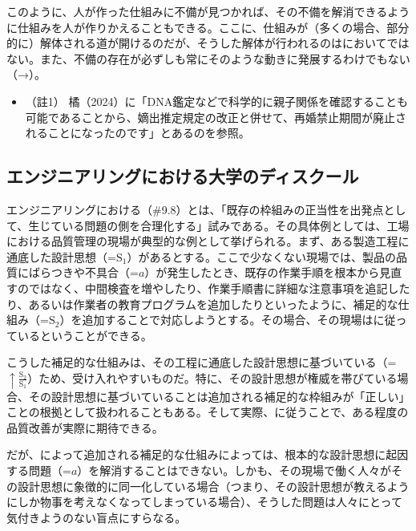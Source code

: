 このように、人が作った仕組みに不備が見つかれば、その不備を解消できるように仕組みを人が作りかえることもできる。ここに、仕組みが（多くの場合、部分的に）解体される道が開けるのだが、そうした解体が行われるのはにおいてではない。また、不備の存在が必ずしも常にそのような動きに発展するわけでもない（→）。

\begin{itemize}
\tightlist
\item
  （註1）
  橘（2024）\cite{Tachibana}に「DNA鑑定などで科学的に親子関係を確認することも可能であることから、嫡出推定規定の改正と併せて、再婚禁止期間が廃止されることになったのです」とあるのを参照。
\end{itemize}

\subsection{エンジニアリングにおける大学のディスクール}\label{ux30a8ux30f3ux30b8ux30cbux30a2ux30eaux30f3ux30b0ux306bux304aux3051ux308bux5927ux5b66ux306eux30c7ux30a3ux30b9ux30afux30fcux30eb}

エンジニアリングにおける（\#9.8）とは、「既存の枠組みの正当性を出発点として、生じている問題の側を合理化する」試みである。その具体例としては、工場における品質管理の現場が典型的な例として挙げられる。まず、ある製造工程に通底した設計思想（=\(\textrm{S}_1\)）があるとする。ここで少なくない現場では、製品の品質にばらつきや不具合（=\(a\)）が発生したとき、既存の作業手順を根本から見直すのではなく、中間検査を増やしたり、作業手順書に詳細な注意事項を追記したり、あるいは作業者の教育プログラムを追加したりといったように、補足的な仕組み（=\(\textrm{S}_2\)）を追加することで対応しようとする。その場合、その現場はに従っているということができる。

こうした補足的な仕組みは、その工程に通底した設計思想に基づいている（=\(\uparrow\frac{\textrm{S}_2}{\textrm{S}_1}\)）ため、受け入れやすいものだ。特に、その設計思想が権威を帯びている場合、その設計思想に基づいていることは追加される補足的な枠組みが「正しい」ことの根拠として扱われることもある。そして実際、に従うことで、ある程度の品質改善が実際に期待できる。

だが、によって追加される補足的な仕組みによっては、根本的な設計思想に起因する問題（=\(a\)）を解消することはできない。しかも、その現場で働く人々がその設計思想に象徴的に同一化している場合（つまり、その設計思想が教えるようにしか物事を考えなくなってしまっている場合）、そうした問題は人々にとって気付きようのない盲点にすらなる。

